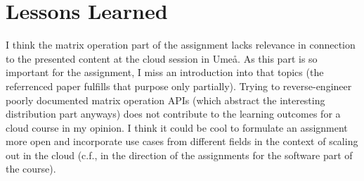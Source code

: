 \documentclass{prog_report}
\begin{document}
\section{Lessons Learned}
I think the matrix operation part of the assignment lacks relevance in connection to the presented content at the cloud session in Umeå.
As this part is so important for the assignment, I miss an introduction into that topics (the referrenced paper fulfills that purpose only partially).
Trying to reverse-engineer poorly documented matrix operation APIs (which abstract the interesting distribution part anyways) does not contribute to the learning outcomes for a cloud course in my opinion.
I think it could be cool to formulate an assignment more open and incorporate use cases from different fields in the context of scaling out in the cloud (c.f., in the direction of the assignments for the software part of the course).



\end{document}
